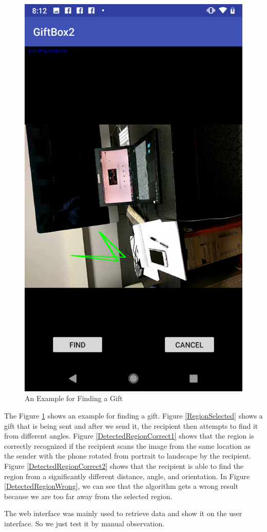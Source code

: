 \begin{figure}[htb]
\begin{minipage}[H]{0.3\textwidth}
\includegraphics[width=.95\textwidth]{section05/assets/resultExample1.png}
\subcaption{\label{DetectedRegionWrong}}
\end{minipage}%
\caption[An Example for finding a gift]{\label{AnExampleForFindingAGift}An Example for Finding a Gift}
\end{figure}

\par The Figure \ref{AnExampleForFindingAGift} shows an example for finding a gift. Figure \ref{RegionSelected} shows a gift that is being sent and after we send it, the recipient then attempts to find it from different angles. Figure \ref{DetectedRegionCorrect1} shows that the region is correctly recognized if the recipient scans the image from the same location as the sender with the phone rotated from portrait to landscape by the recipient.  Figure \ref{DetectedRegionCorrect2} shows that the recipient is able to find the region from a significantly different distance, angle, and orientation. In Figure \ref{DetectedRegionWrong}, we can see that the algorithm gets a wrong result because we are too far away from the selected region. 
\par The web interface was mainly used to retrieve data and show it on the user interface. So we just test it by manual observation. 
